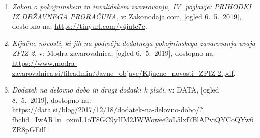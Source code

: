 \documentclass[12pt, a4paper]{article}
\begin{document}
\begin{enumerate}
\item
\label{ZPIZ2}
\emph{Zakon o pokojninskem in invalidskem zavarovanju, IV. poglavje: PRIHODKI IZ DRŽAVNEGA PRORAČUNA}, v: Zakonodaja.com, [ogled 6.~5.~2019], dostopno na: \url{https://tinyurl.com/y4jutc7c}.

\item
\label{Novosti ZIPZ2}
\emph{Ključne novosti, ki jih na področju dodatnega pokojninskega zavarovanja uvaja ZPIZ-2}, v: Modra zavarovalnica, [ogled 6.~5.~2019], dostopno na: \url{https://www.modra-zavarovalnica.si/fileadmin/Javne_objave/Kljucne_novosti_ZPIZ-2.pdf}.

\item
\label{Dodatek na delovno dobo in drugi dodatki k plači}
\emph{Dodatek na delovno dobo in drugi dodatki k plači}, v: DATA, [ogled 8.~5.~2019], dostopno na:\\ \url{https://data.si/blog/2017/12/18/dodatek-na-delovno-dobo/?fbclid=IwAR1u_oxmL1oT8GC9yIIM2JWWowee2oL5lxf7BlAPviQYCoQYw6ZR8pGEilI}.
\end{enumerate}
\end{document}
